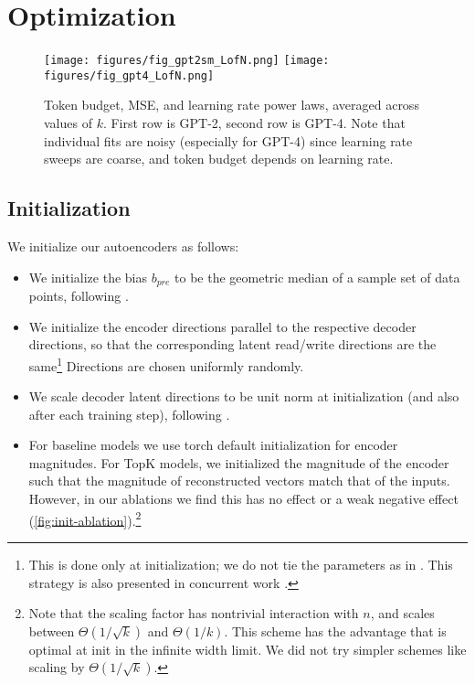 \section{Optimization}
\label{sec:optimization}



\begin{figure}
\centering
    \texttt{[image: figures/fig\_gpt2sm\_LofN.png]}
    \texttt{[image: figures/fig\_gpt4\_LofN.png]}
    
    \caption{Token budget, MSE, and learning rate power laws, averaged across values of $k$. First row is GPT-2, second row is GPT-4. Note that individual fits are noisy (especially for GPT-4) since learning rate sweeps are coarse, and token budget depends on learning rate.}
    \label{fig:lr_tok_powerlaws}

\end{figure}




\subsection{Initialization}
\label{sec:init}

We initialize our autoencoders as follows: 

\begin{itemize}
\item We initialize the bias $b_{pre}$ to be the geometric median of a sample set of data points, following \citet{bricken2023monosemanticity}.
\item We initialize the encoder directions parallel to the respective decoder directions, so that the corresponding latent read/write directions are the same\footnote{This is done only at initialization; we do not tie the parameters as in \citet{cunningham2023sparse}.  This strategy is also presented in concurrent work \citep{conerly2024update}.} Directions are chosen uniformly randomly.
\item We scale decoder latent directions to be unit norm at initialization (and also after each training step), following \citet{bricken2023monosemanticity}.
\item For baseline models we use torch default initialization for encoder magnitudes.  For TopK models, we initialized the magnitude of the encoder such that the magnitude of reconstructed vectors match that of the inputs. However, in our ablations we find this has no effect or a weak negative effect (\autoref{fig:init-ablation}).\footnote{Note that the scaling factor has nontrivial interaction with $n$, and scales between $\Theta(1/\sqrt{k})$ and $\Theta(1/k)$. This scheme has the advantage that is optimal at init in the infinite width limit. We did not try simpler schemes like scaling by $\Theta(1/\sqrt{k})$.}
\end{itemize}

